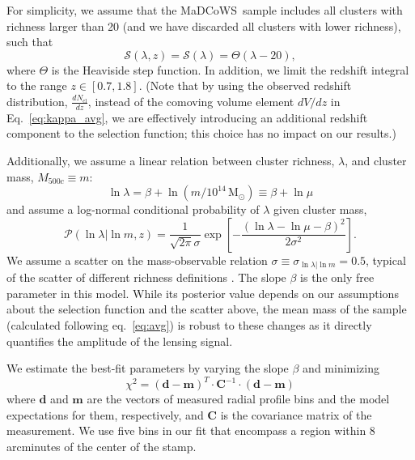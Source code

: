 \documentclass[preprint2]{aastex63}
\newcommand{\madcows}{MaDCoWS}
\newcommand{\Msun}{\mathrm{M}_\odot}
\newcommand{\observable}{\lambda}
\begin{document}
%
For simplicity, we assume that the \madcows\ sample includes all clusters with richness larger than 20 (and we have discarded all clusters with lower richness), such that
\begin{equation}
    \mathcal{S}(\observable,z) = \mathcal{S}(\observable) = \Theta(\observable-20),
\end{equation}
where $\Theta$ is the Heaviside step function. 
%
In addition, we limit the redshift integral to the range $z\in[0.7,1.8]$. (Note that by using the observed redshift distribution, $\frac{dN_\mathrm{cl}}{dz}$, instead of the comoving volume element $dV/dz$ in Eq.\ \ref{eq:kappa_avg}, we are effectively introducing an additional redshift component to the selection function; this choice has no impact on our results.)

Additionally, we assume a linear relation between cluster richness, $\observable$, and cluster mass, $M_{500c}\equiv m$:
\begin{equation}\label{eq:scaling}
\ln \observable = \beta + \ln (m/10^{14}\,\Msun) \equiv \beta + \ln\mu
\end{equation}
and assume a log-normal conditional probability of $\observable$ given cluster mass,
\begin{equation}
    \mathcal{P}(\ln\observable|\ln m,z) = \frac1{\sqrt{2\pi}\sigma}
    \exp\left[-\frac{(\ln\observable-\ln\mu-\beta)^2}{2\sigma^2}\right].
\end{equation}
We assume a scatter on the mass-observable relation $\sigma\equiv\sigma_{\ln\observable|\ln m}=0.5$, typical of the scatter of different richness definitions \citep{rozo14,murata19}. The slope $\beta$ is the only free parameter in this model. While its posterior value depends on our assumptions about the selection function and the scatter above, the mean mass of the sample (calculated following eq.\ \ref{eq:avg}) is robust to these changes as it directly quantifies the amplitude of the lensing signal.

We estimate the best-fit parameters by varying the slope $\beta$ and minimizing
\begin{equation}
    \chi^2 = \left(\mathbf{d-m}\right)^T\cdot\mathbf{C}^{-1}\cdot\left(\mathbf{d-m}\right)
\end{equation}
where $\mathbf{d}$ and $\mathbf{m}$ are the vectors of measured radial profile bins and the model expectations for them, respectively, and $\mathbf{C}$ is the covariance matrix of the measurement. We use five bins in our fit that encompass a region within 8 arcminutes of the center of the stamp.
\end{document}
